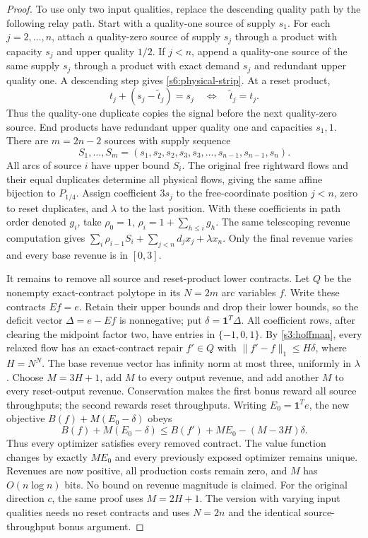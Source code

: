 \begin{proof}
To use only two input qualities, replace the descending quality path by
the following relay path. Start with a quality-one source of supply
$s_1$. For each $j=2,\ldots,n$, attach a quality-zero source of supply
$s_j$ through a product with capacity $s_j$ and upper quality $1/2$.
If $j<n$, append a quality-one source of the same supply $s_j$ through
a product with exact demand $s_j$ and redundant upper quality one.
A descending step gives \eqref{s6:physical-strip}. At a reset product,
\[
 t_j+(s_j-\widetilde t_j)=s_j
 \quad\Longleftrightarrow\quad\widetilde t_j=t_j.
\]
Thus the quality-one duplicate copies the signal before the next
quality-zero source. End products have redundant upper quality one
and capacities $s_1,1$. There are $m=2n-2$ sources with supply sequence
\[
 S_1,\ldots,S_m=(s_1,s_2,s_2,s_3,s_3,\ldots,s_{n-1},s_{n-1},s_n).
\]
All arcs of source $i$ have upper bound $S_i$.
The original free rightward flows and their equal duplicates determine
all physical flows, giving the same affine bijection to $P_{1/4}$.
Assign coefficient $3s_j$ to the free-coordinate position $j<n$,
zero to reset duplicates, and $\lambda$ to the last position.
With these coefficients in path order denoted $g_i$, take
$\rho_0=1$, $\rho_i=1+\sum_{h\le i}g_h$.
The same telescoping revenue computation gives
$\sum_i\rho_{i-1}S_i+\sum_{j<n}d_jx_j+\lambda x_n$.
Only the final revenue varies and every base revenue is in $[0,3]$.

It remains to remove all source and reset-product lower contracts.
Let $Q$ be the nonempty exact-contract polytope in its $N=2m$ arc
variables $f$. Write these contracts $Ef=e$. Retain their upper bounds
and drop their lower bounds, so the deficit vector
$\Delta=e-Ef$ is nonnegative; put $\delta=\mathbf1^T\Delta$.
All coefficient rows, after clearing the midpoint factor two, have
entries in $\{-1,0,1\}$. By \cref{s3:hoffman}, every relaxed flow has
an exact-contract repair $f'\in Q$ with
$\|f'-f\|_1\le H\delta$, where $H=N^N$.
The base revenue vector has infinity norm at most three, uniformly in
$\lambda$. Choose $M=3H+1$, add $M$ to every output revenue, and add
another $M$ to every reset-output revenue. Conservation makes the first
bonus reward all source throughputs; the second rewards reset throughputs.
Writing $E_0=\mathbf1^Te$, the new objective $B(f)+M(E_0-\delta)$ obeys
\[
 B(f)+M(E_0-\delta)
 \le B(f')+ME_0-(M-3H)\delta.
\]
Thus every optimizer satisfies every removed contract. The value function
changes by exactly $ME_0$ and every previously exposed optimizer remains
unique. Revenues are now positive, all production costs remain zero,
and $M$ has $O(n\log n)$ bits. No bound on revenue magnitude is claimed.
For the original direction $c$, the same proof uses $M=2H+1$.
The version with varying input qualities needs no reset contracts and
uses $N=2n$ and the identical source-throughput bonus argument.
\end{proof}

